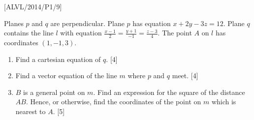\item {[}ALVL/2014/P1/9{]}

Planes $p$ and $q$ are perpendicular. Plane $p$ has equation $x+2y-3z=12$.
Plane $q$ contains the line $l$ with equation $\frac{x-1}{2}=\frac{y+1}{-1}=\frac{z-3}{4}$.
The point $A$ on $l$ has coordinates $(1,-1,3)$.
\begin{enumerate}
\item Find a cartesian equation of $q$.\hfill{} {[}4{]}
\item Find a vector equation of the line $m$ where $p$ and $q$ meet.
\hfill{}{[}4{]}
\item $B$ is a general point on $m$. Find an expression for the square
of the distance $AB$. Hence, or otherwise, find the coordinates of
the point on $m$ which is nearest to $A$. \hfill{}{[}5{]}
\end{enumerate}
